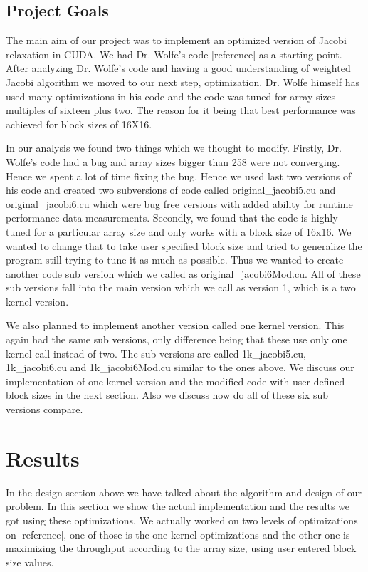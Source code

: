 \documentclass[10pt]{article}
\begin{document}
\begin{multicols}{2}
  \subsection{Project Goals}
  The main aim of our project was to implement an optimized version of Jacobi relaxation in CUDA.
  We had Dr. Wolfe’s code [reference] as a starting point.
  After analyzing Dr. Wolfe’s code and having a good understanding of weighted Jacobi algorithm we moved to our next step, optimization.
  Dr. Wolfe himself has used many optimizations in his code and the code was tuned for array sizes multiples of sixteen plus two.
  The reason for it being that best performance was achieved for block sizes of 16X16. 

  In our analysis we found two things which we thought to modify.
  Firstly, Dr. Wolfe’s code had a bug and array sizes bigger than 258 were not converging.
  Hence we spent a lot of time fixing the bug.
  Hence we used last two versions of his code and created two subversions of code called original\_jacobi5.cu and original\_jacobi6.cu which were bug free versions with added ability for runtime performance data measurements.
  Secondly, we found that the code is highly tuned for a particular array size and only works with a bloxk size of 16x16.
  We wanted to change that to take user specified block size and tried to generalize the program still trying to tune it as much as possible.
  Thus we wanted to create another code sub version which we called as original\_jacobi6Mod.cu.
  All of these sub versions fall into the main version which we call as version 1, which is a two kernel version.

  We also planned to implement another version called one kernel version.
  This again had the same sub versions, only difference being that these use only one kernel call instead of two.
  The sub versions are called 1k\_jacobi5.cu, 1k\_jacobi6.cu and 1k\_jacobi6Mod.cu similar to the ones above.
  We discuss our implementation of one kernel version and the modified code with user defined block sizes in the next section.
  Also we discuss how do all of these six sub versions compare.

  \section{Results} %
  In the design section above we have talked about the algorithm and design of our problem.
  In this section we show the actual implementation and the results we got using these optimizations.
  We actually worked on two levels of optimizations on [reference], one of those is the one kernel optimizations and the other one is maximizing the throughput according to the array size, using user entered block size values.


\end{multicols}
\end{document}
